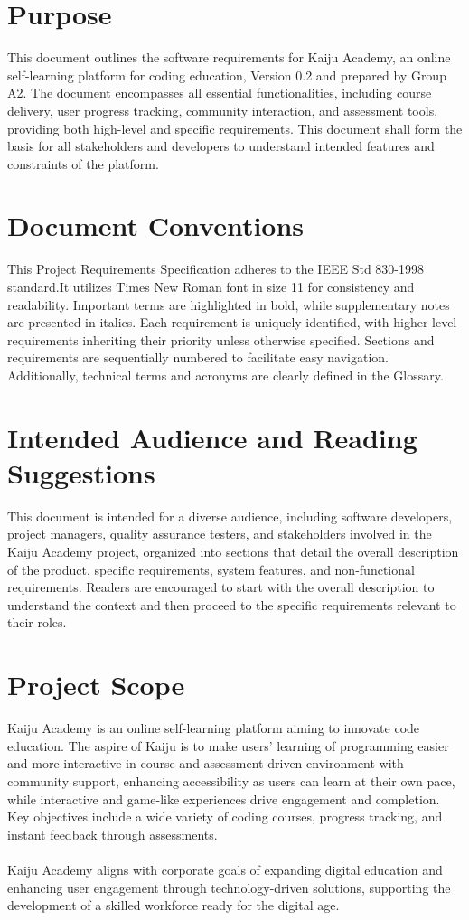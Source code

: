 \documentclass[a4paper, 11pt]{scrreprt}
\begin{document}
\section{Purpose}
This document outlines the software requirements for Kaiju Academy, an online self-learning platform for coding education, Version 0.2 and prepared by Group A2. The document encompasses all essential functionalities, including course delivery, user progress tracking, community interaction, and assessment tools, providing both high-level and specific requirements.  This document shall form the basis for all stakeholders and developers to understand intended features and constraints of the platform.

\section{Document Conventions}
This Project Requirements Specification adheres to the IEEE Std 830-1998 standard.It utilizes Times New Roman font in size 11 for consistency and readability. Important terms are highlighted in bold, while supplementary notes are presented in italics. Each requirement is uniquely identified, with higher-level requirements inheriting their priority unless otherwise specified. Sections and requirements are sequentially numbered to facilitate easy navigation. Additionally, technical terms and acronyms are clearly defined in the Glossary.
\section{Intended Audience and Reading Suggestions}
This document is intended for a diverse audience, including software developers, project managers, quality assurance testers, and stakeholders involved in the Kaiju Academy project, organized into sections that detail the overall description of the product, specific requirements, system features, and non-functional requirements. Readers are encouraged to start with the overall description to understand the context and then proceed to the specific requirements relevant to their roles.

\section{Project Scope}
Kaiju Academy is an online self-learning platform aiming to innovate code education. The aspire of Kaiju is to make users' learning of programming easier and more interactive in course-and-assessment-driven environment with community support, enhancing accessibility as users can learn at their own pace, while interactive and game-like experiences drive engagement and completion. Key objectives include a wide variety of coding courses, progress tracking, and instant feedback through assessments.\\\\
Kaiju Academy aligns with corporate goals of expanding digital education and enhancing user engagement through technology-driven solutions, supporting the development of a skilled workforce ready for the digital age.
\end{document}

